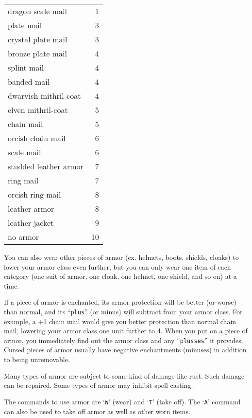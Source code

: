 \begin{center}
\begin{tabular}{lr}
dragon scale mail     &  1\\
plate mail            &  3\\
crystal plate mail    &  3\\
bronze plate mail     &  4\\
splint mail           &  4\\
banded mail           &  4\\
dwarvish mithril-coat &  4\\
elven mithril-coat    &  5\\
chain mail            &  5\\
orcish chain mail     &  6\\
scale mail            &  6\\
studded leather armor &  7\\
ring mail             &  7\\
orcish ring mail      &  8\\
leather armor         &  8\\
leather jacket        &  9\\
no armor              & 10
\end{tabular}
\end{center}

You can also wear other pieces of armor (ex. helmets, boots, shields, cloaks)
to lower your armor class even further, but you can only wear one item
of each category (one suit of armor, one cloak, one helmet, one
shield, and so on) at a time.

If a piece of armor is enchanted, its armor protection will be better
(or worse) than normal, and its ``{\tt plus}'' (or minus) will subtract from
your armor class.  For example, a +1 chain mail would give you
better protection than normal chain mail, lowering your armor class one
unit further to 4.  When you put on a piece of armor, you immediately
find out the armor class and any ``{\tt plusses}'' it provides.  Cursed
pieces of armor usually have negative enchantments (minuses) in
addition to being unremovable.

Many types of armor are subject to some kind of damage like rust.  Such
damage can be repaired.  Some types of armor may inhibit spell casting.

The commands to use armor are `{\tt W}' (wear) and `{\tt T}' (take off).
The `{\tt A}' command can also be used to take off armor as well as other
worn items.
